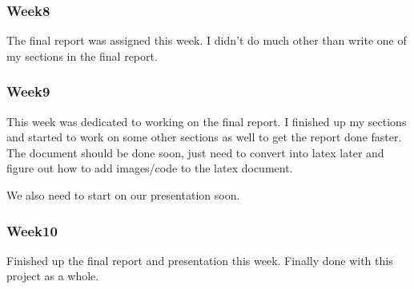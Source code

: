 	\subsubsection*{Week8}
		The final report was assigned this week. I didn't do much other than write one of my sections in the final report.
	\subsubsection*{Week9}
		This week was dedicated to working on the final report. I finished up my sections and started to work on some other sections as well to get the report done faster. The document should be done soon, just need to convert into latex later and figure out how to add images/code to the latex document.

		We also need to start on our presentation soon.
	\subsubsection*{Week10}
		Finished up the final report and presentation this week. Finally done with this project as a whole.
